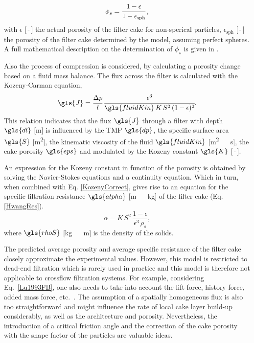 \begin{equation}
  \phi_s= \cfrac{1-\epsilon}{1-\epsilon_\mathrm{sph}} \, ,
\end{equation}
with $\epsilon$ [\,-\,] the actual porosity of the filter cake for non-sperical particles, $\epsilon_\mathrm{sph}$ [\,-\,] the porosity of the filter cake determined by the model, assuming perfect spheres. A full mathematical description on the determination of $\phi_s$ is given in \cite{Cross1985}. \par
Also the process of compression is considered, by calculating a porosity change based on a fluid mass balance. The flux across the filter is calculated with the Kozeny-Carman equation,
\begin{equation}
\gls{J} = \cfrac{\mathrm{\Delta}p}{l}\, \cfrac{\epsilon^3}{\gls{fluidKin} \, K\, S^2 \, (1-\epsilon)^2}
\label{KozenyCorrect} .
\end{equation}
This relation indicates that the flux $\gls{J}$ through a filter with depth $\gls{dl}$ [\unit{\metre}] is influenced by the \gls{TMP} $\gls{dp}$, the specific surface area $\gls{S}$ [\unit{\metre\squared}], the kinematic viscosity of the fluid $\gls{fluidKin}$ [\unit{\metre\squared\, \reciprocal\second}], the cake porosity $\gls{eps}$ and modulated by the Kozeny constant $\gls{K}$ [\,-\,]. \par
An expression for the Kozeny constant in function of the porosity is obtained by solving the Navier-Stokes equations and a continuity equation. Which in turn, when combined with Eq. \eqref{KozenyCorrect}, gives rise to an equation for the specific filtration resistance $\gls{alpha}$ [\unit{\metre\, \reciprocal\kilogram}] of the filter cake (Eq. \ref{HwangRes}). 
\begin{equation}
\alpha = K \, S^2 \, \frac{1-\epsilon}{\epsilon^3 \, \rho_s}
\label{HwangRes} ,
\end{equation}
where $\gls{rhoS}$ [\unit{\kilogram\, \rpcubic\metre}] is the density of the solids. \par
The predicted average porosity and average specific resistance of the filter cake closely approximate the experimental values. However, this model is restricted to dead-end filtration which is rarely used in practice and this model is therefore not applicable to crossflow filtration systems. For example, considering Eq.\ \eqref{Lu1993FB}, one also needs to take into account the lift force, history force, added mass force, etc.\ \citep{Ghijs2014}. The assumption of a spatially homogeneous flux is also too straightforward and might influence the rate of local cake layer build-up considerably, as well as the architecture and porosity. Nevertheless, the introduction of a critical friction angle and the correction of the cake porosity with the shape factor of the particles are valuable ideas. 

